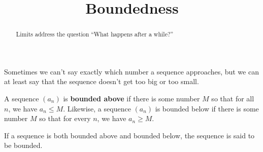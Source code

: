 \documentclass{ximera}
\title{Boundedness}
\newcommand{\defnword}[1]{\textbf{#1}}
\newcommand{\ds}{\displaystyle}
\renewcommand{\index}[1]{}
\renewcommand{\label}[1]{}
\begin{document}
\begin{abstract}
  Limits address the question ``What happens after a while?''
\end{abstract}

\maketitle

Sometimes we can't say exactly which number a sequence approaches, but
we can at least say that the sequence doesn't get too big or too
small.

\begin{definition}
  \label{definition:sequence-bounded}
  A sequence $(a_n)$ is \defnword{bounded
    above}\index{sequence!bounded above} if there is some number
$M$ so that for all $n$, we have $\ds a_n\le M$.  Likewise, a sequence
$(a_n)$ is {\dfont bounded below\index{sequence!bounded below}\/} if
there is some number $M$ so that for every $n$, we have $\ds a_n\ge M$.

If a sequence is both bounded above and bounded below, the sequence is said
to be {\dfont bounded\index{sequence!bounded}\/}.
\end{definition}

\end{document}
